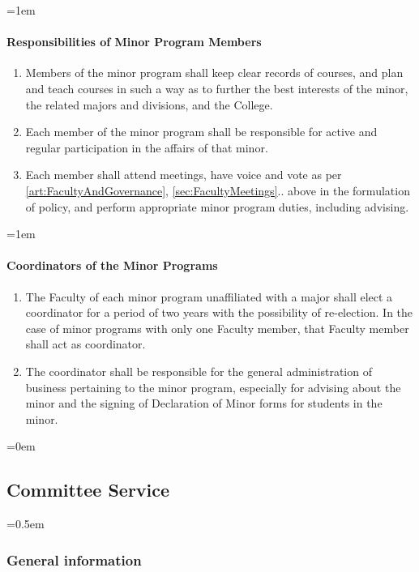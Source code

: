 \documentclass{manual}
\let\oldsubsection\subsection
\renewcommand\subsection{\leftskip=0em\oldsubsection}
\let\oldsubsubsection\subsubsection
\renewcommand\subsubsection{\leftskip=0.5em\oldsubsubsection}
\let\oldparagraph\paragraph
\renewcommand\paragraph{\leftskip=1em\oldparagraph}
\newcommand{\itemLevelA}{\alph*.}
\newcommand{\itemRefA}{\alph*}
\begin{document}
\paragraph{Responsibilities of Minor Program Members}
\begin{enumerate}[label=\itemLevelA,ref=\itemRefA]

\item Members of the minor program shall keep clear records of courses, and plan and teach courses in such a way as to further the best interests of the minor, the related majors and divisions, and the College.

\item Each member of the minor program shall be responsible for active and regular participation in the affairs of that minor.

\item Each member shall attend meetings, have voice and vote as per \cref{art:FacultyAndGovernance}, \cref{sec:FacultyMeetings}.. above in the formulation of policy, and perform appropriate minor program duties, including advising.
\end{enumerate}


\paragraph{Coordinators of the Minor Programs}
\begin{enumerate}[label=\itemLevelA,ref=\itemRefA]

\item The Faculty of each minor program unaffiliated with a major shall elect a coordinator for a period of two years with the possibility of re-election. In the case of minor programs with only one Faculty member, that Faculty member shall act as coordinator.

\item The coordinator shall be responsible for the general administration of business pertaining to the minor program, especially for advising about the minor and the signing of Declaration of Minor forms for students in the minor.
\end{enumerate}


\subsection{Committee Service}\label{sec:CommitteeService}

\subsubsection{General information}\label{sub:GeneralInformation}
\end{document}

